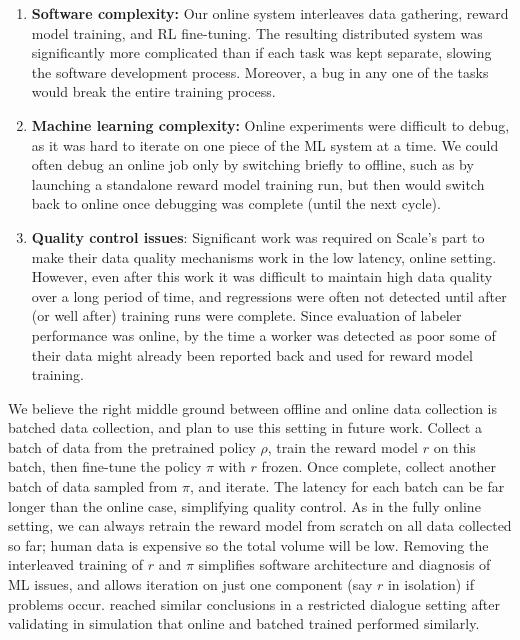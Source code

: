 \begin{enumerate}
\item \textbf{Software complexity:} Our online system interleaves data gathering, reward model training, and RL fine-tuning.  The resulting distributed system was significantly more complicated than if each task was kept separate, slowing the software development process.  Moreover, a bug in any one of the tasks would break the entire training process. 
\item \textbf{Machine learning complexity:} Online experiments were difficult to debug, as it was hard to iterate on one piece of the ML system at a time.  We could often debug an online job only by switching briefly to offline, such as by launching a standalone reward model training run, but then would switch back to online once debugging was complete (until the next cycle).
\item \textbf{Quality control issues}: Significant work was required on Scale's part to make their data quality mechanisms work in the low latency, online setting.  However, even after this work it was difficult to maintain high data quality over a long period of time, and regressions were often not detected until after (or well after) training runs were complete.  Since evaluation of labeler performance was online, by the time a worker was detected as poor some of their data might already been reported back and used for reward model training.
\end{enumerate}

We believe the right middle ground between offline and online data collection is batched data collection, and plan to use this setting in future work.  Collect a batch of data from the pretrained policy $\rho$, train the reward model $r$ on this batch, then fine-tune the policy $\pi$ with $r$ frozen.  Once complete, collect another batch of data sampled from $\pi$, and iterate.  The latency for each batch can be far longer than the online case, simplifying quality control.  As in the fully online setting, we can always retrain the reward model from scratch on all data collected so far; human data is expensive so the total volume will be low.  Removing the interleaved training of $r$ and $\pi$ simplifies software architecture and diagnosis of ML issues, and allows iteration on just one component (say $r$ in isolation) if problems occur.  \citet{li2016dialogue} reached similar conclusions in a restricted dialogue setting after validating in simulation that online and batched trained performed similarly.

